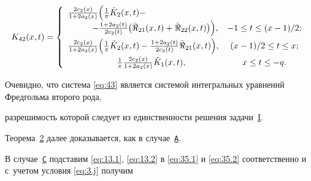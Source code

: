 $$

{K_{42}}(x,t) = \left\{ 

\begin{array}{lc}

\frac{{2{c_2}(x)}}{{1 + 2{a_2}(x)}}

\Bigl( 

\frac{1}{\pi }{{\tilde K}_2}(x,t) - & \\

\hspace{1cm}

- \frac{{1 + 2{a_2}(t)}}{{2{c_2}(t)}} 

\bigl( {{{\bar \Re }_{21}}(x,t) + {{\bar \Re }_{22}}(x,t)} \bigr) \Bigr), & - 1 \le t \le ({{x - 1}})/{2};

\\[2mm]

\frac{{2{c_2}(x)}}{{1 + 2{a_2}(x)}}\Bigl( {\frac{1}{\pi }{{\tilde K}_2}(x,t) - \frac{{1 + 2{a_2}(t)}}{{2{c_2}(t)}} {{\bar \Re }_{21}}(x,t)} \Bigr), & ({{x - 1}})/{2} \le t \le x;\\[2mm]

\hspace{2cm}

\frac{1}{\pi } \frac{{2{c_2}(x)}}{{1 + 2{a_2}(x)}} {{\tilde K}_1}(x,t), & x \le t \le  - q.

\end{array} \right.

$$



Очевидно, что система \eqref{eq:43}  является системой интегральных уравнений Фредгольма второго рода, 

разрешимость которой следует из единственности решения задачи~\hyperlink{abd:taskI}{I}.

Теорема~\hyperlink{abd:th2}{2} далее доказывается, как в случае~\hyperlink{abd:A}{\tt А}.

  



\smallskip  

  



В случае~\hyperlink{abd:C}{\tt C} подставим \eqref{eq:13.1}, \eqref{eq:13.2} в \eqref{eq:35.1} и \eqref{eq:35.2}  соответственно и с~учетом условия \eqref{eq:3.j} получим

